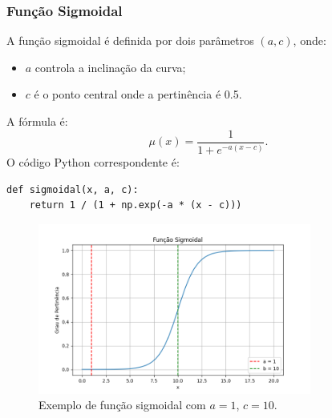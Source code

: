 \documentclass[a4paper,12pt]{article}
\begin{document}
\subsubsection{Função Sigmoidal}
A função sigmoidal é definida por dois parâmetros $(a, c)$, onde:
\begin{itemize}
    \item $a$ controla a inclinação da curva;
    \item $c$ é o ponto central onde a pertinência é 0.5.
\end{itemize}
A fórmula é:
\[
\mu(x) = \frac{1}{1 + e^{-a(x - c)}}.
\]
O código Python correspondente é:
\begin{verbatim}
def sigmoidal(x, a, c):
    return 1 / (1 + np.exp(-a * (x - c)))
\end{verbatim}
\begin{figure}[H]
    \centering
    \includegraphics[width=0.8\textwidth]{img/sigmoidal.png}
    \caption{Exemplo de função sigmoidal com $a=1$, $c=10$.}
\end{figure}
\end{document}
